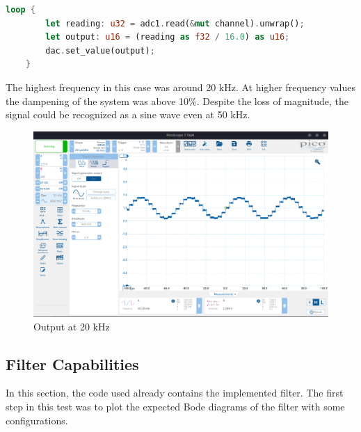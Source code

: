 \begin{lstlisting}[language=Rust,frame=single,float=!ht,style=customrust,label={lst:adc-dac-test},caption={Code for Testing ADC and DAC Together}]
    loop {
        let reading: u32 = adc1.read(&mut channel).unwrap();
        let output: u16 = (reading as f32 / 16.0) as u16;
        dac.set_value(output);
    }
\end{lstlisting}

The highest frequency in this case was around 20 kHz. At higher frequency values the dampening of the system was above 10\%. Despite the loss of magnitude, the signal could be recognized as a sine wave even at 50 kHz.

\begin{figure}[H]
    \centering
    \includegraphics[width=150mm, keepaspectratio]{figures/sine20khz.png}
    \caption{Output at 20 kHz}
    \label{fig:sine20khz}
\end{figure}

\subsection{Filter Capabilities}

In this section, the code used already contains the implemented filter. The first step in this test was to plot the expected Bode diagrams of the filter with some configurations.

